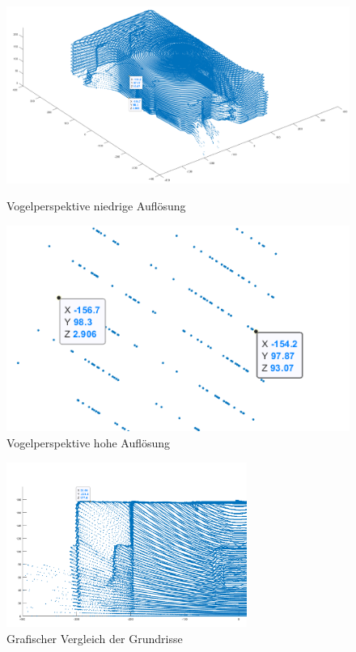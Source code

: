 \begin{figure}[htb]
	\centering
	\begin{minipage}[t]{0.45\linewidth}
		\centering
		\includegraphics[width=1.2\linewidth]{images/Validierung/Genauigkeit/wandbreite_alles.png}
		\caption{Vogelperspektive niedrige Auflösung}
		\label{wandbreite_alles}
	\end{minipage}
	\hfill
	\begin{minipage}[t]{0.45\linewidth}
		\centering
		\includegraphics[width=1.2\linewidth]{images/Validierung/Genauigkeit/wandbreite.png}
		\caption{Vogelperspektive hohe Auflösung}
		\label{wandbreite_label}
	\end{minipage}
\end{figure}


\begin{figure}[H]
	\centering
	\includegraphics[width=0.7\textwidth]{images/Validierung/Genauigkeit/Hoehe}
	\caption{Grafischer Vergleich der Grundrisse}
	\label{uebereinaasdasfnder}
\end{figure}



